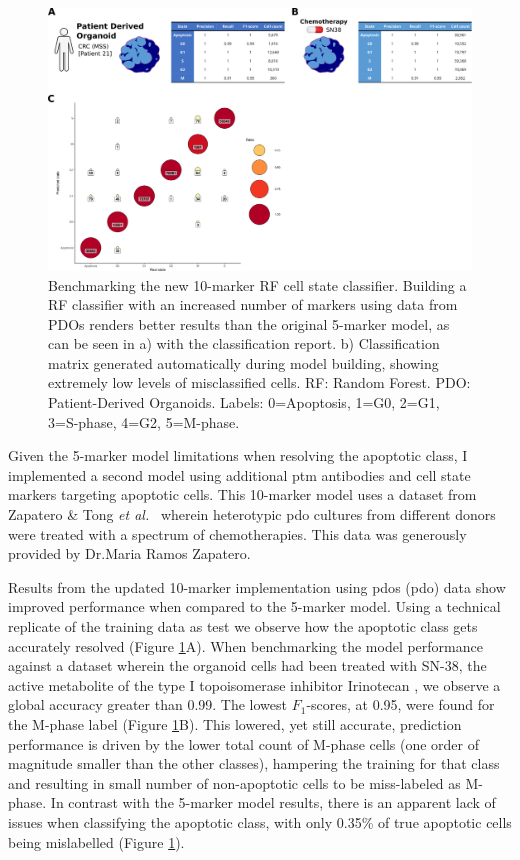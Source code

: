 \begin{figure}
    \centering
    \includegraphics{03cytof/figs/3CLASS_10m.png}
    \caption{Benchmarking the new 10-marker RF cell state classifier. Building a RF classifier with an increased number of markers using data from PDOs renders better results than the original 5-marker model, as can be seen in a) with the classification report. b) Classification matrix generated automatically during model building, showing extremely low levels of misclassified cells. RF: Random Forest. PDO: Patient-Derived Organoids. Labels: 0=Apoptosis, 1=G0, 2=G1, 3=S-phase, 4=G2, 5=M-phase.}
    \label{fig:3class10m}
\end{figure}

Given the 5-marker model limitations when resolving the apoptotic class, I implemented a second model using additional \acrshort{ptm} antibodies and cell state markers targeting apoptotic cells. This 10-marker model uses a dataset from Zapatero \& Tong \emph{et al.}~\cite{zapatero_trellis_2023} wherein heterotypic \acrlong{pdo} cultures from different donors were treated with a spectrum of chemotherapies. This data was generously provided by Dr.Maria Ramos Zapatero.

Results from the updated 10-marker implementation using \acrlong{pdo}s (\acrshort{pdo}) data show improved performance when compared to the 5-marker model. Using a technical replicate of the training data as test we observe how the apoptotic class gets accurately resolved (Figure \ref{fig:3class10m}A). When benchmarking the model performance against a dataset wherein the organoid cells had been treated with SN-38, the active metabolite of the type I topoisomerase inhibitor Irinotecan \cite{mathijssen_clinical_2001}, we observe a global accuracy greater than 0.99. The lowest $F_1$-scores, at 0.95, were found for the M-phase label (Figure \ref{fig:3class10m}B). This lowered, yet still accurate, prediction performance is driven by the lower total count of M-phase cells (one order of magnitude smaller than the other classes), hampering the training for that class and resulting in small number of non-apoptotic cells to be miss-labeled as M-phase.
In contrast with the 5-marker model results, there is an apparent lack of issues when classifying the apoptotic class, with only 0.35\% of true apoptotic cells being mislabelled (Figure \ref{fig:3class10m}).

